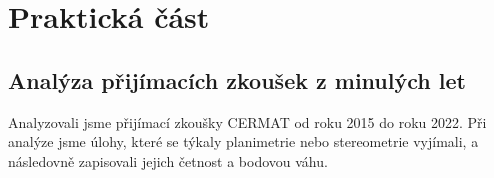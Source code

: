 \chapter{Praktická část}


\section{Analýza přijímacích zkoušek z minulých let}

Analyzovali jsme přijímací zkoušky CERMAT od roku 2015 do roku 2022. Při analýze jsme úlohy, které se týkaly planimetrie nebo stereometrie vyjímali, a následovně zapisovali jejich četnost a bodovou váhu.


